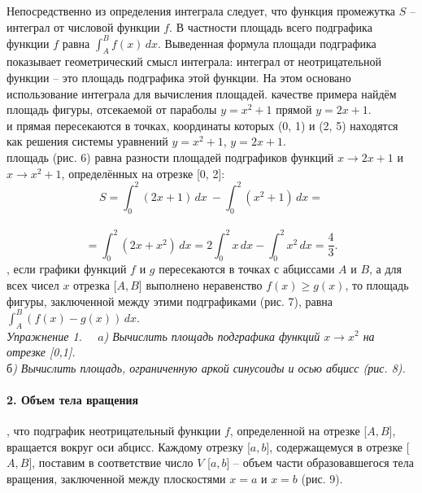 \hfill
\hfill
\begin{minipage}[]{0.4\textwidth}
\parindent=0.6cm
\par
Непосредственно из определения интеграла следует, что функция про\-межутка $S$ -- интеграл от числовой функции $f$. В частности площадь всего подграфика функции $f$ равна \(\int_{A}^{B} f(x) \,dx\). Выведенная формула площади подграфика показывает геомет\-рический смысл интеграла: интеграл от неотрицательной функции -- это площадь подграфика этой функции. На этом основано использование ин\-теграла для вычисления площадей.
 качестве примера найдём площадь фигуры, отсекаемой от параболы $y = x^2+1$ прямой $y = 2x+1.$ \\
 и прямая пересекаются в точ\-ках, координаты которых (0, 1) и (2, 5) на\-ходятся как решения системы уравнений $y = x^2+1$, $y = 2x+1$. \\
 площадь (рис. 6) равна разности площадей подграфиков функций $x\rightarrow2x+1$ и $x\rightarrow x^2+1$, определённых на отрезке [0, 2]: \[S = \int_{0}^{2} (2x+1)\,dx \ - \int_{0}^{2} (x^2+1)\,dx =\] \\ \[= \int_{0}^{2} (2x+x^2)\,dx = 2\int_{0}^{2} x\,dx - \int_{0}^{2} x^2\,dx = \frac{4}{3}.\]
, если графики функций $f$ и $g$ пересекаются в точках с абциссами $A$ и $B$, а для всех чисел $x$ отрезка [$A, B$] выполнено неравенство $f(x) \geq g(x)$, то площадь фигуры, заключенной между этими подграфиками (рис. 7), равна $\int_{A}^{B} (f(x)-g(x))\,dx$. \\
\indent \textit{Упражнение 1. \ \ $a$) Вычислить площадь подграфика функций $x \rightarrow x^2$ на отрезке [0,1]. \\}
\indent \textit{$б$) Вычислить площадь, ограниченную аркой синусоиды и осью абцисс (рис. 8). \\}
\begin{center}
  \paragraph{2. Объем тела вращения}  
\end{center}
, что подграфик не\-отрицательный функции $f$, определен\-ной на отрезке [$A, B$], вращается вокруг оси абцисс. Каждому отрезку [$a, b$], содержащемуся в отрезке [$A,B$], поставим в соответствие число $V$ [$a, b$] -- объем части образовавше\-гося тела вращения, заключенной между плоскостями $x = a$ и $x = b$ (рис. 9).
\end{minipage}